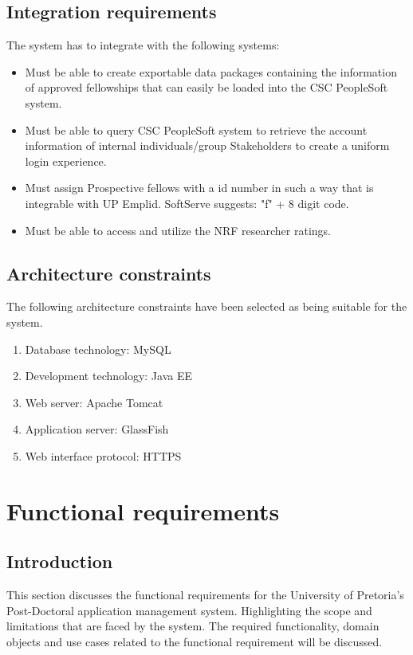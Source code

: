 \documentclass[12pt]{article}
\begin{document}
		\subsection{Integration requirements} %
		\vspace{0.2in}
		The system has to integrate with the following systems:
		\begin{itemize}
			\item Must be able to create exportable data packages containing the information of approved fellowships that can easily be loaded into the CSC PeopleSoft system. 
			\item Must be able to query CSC PeopleSoft system to retrieve the account information of internal individuals/group Stakeholders to create a uniform login experience.
			\item Must assign Prospective fellows with a id number in such a way that is integrable with UP Emplid. SoftServe suggests: "f" + 8 digit code. 
			\item Must be able to access and utilize the NRF researcher ratings.
		\end{itemize}
		\vspace{0.2in}
		
		\subsection{Architecture constraints} %
		\vspace{0.2in}
		The following architecture constraints have been selected as being suitable for the system.
		\begin{enumerate}
			\item Database technology: MySQL
			\item Development technology: Java EE
			\item Web server: Apache Tomcat
			\item Application server: GlassFish 
			\item Web interface protocol: HTTPS
		\end{enumerate}
		\vspace{0.5in}
	
		
	\section{Functional requirements}
		\subsection{Introduction} %
		\vspace{0.2in}
		This section discusses the functional requirements for the University of Pretoria's Post-Doctoral application management system. Highlighting the scope and limitations that are faced by the system. \linebreak \linebreak
		The required functionality, domain objects and use cases related to the functional requirement will be discussed. 
		\vspace{0.2in}
		
\end{document}

